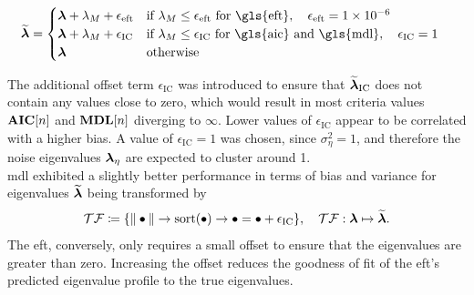 \begin{align}
    \widetilde{\bfm{\lambda}} &=
    \begin{cases}
      \bfm{\lambda} + \lambda_M + \epsilon_{\text{eft}} & \text{if } \lambda_M \leq \epsilon_{\text{eft}} \text{ for \gls{eft}}, \quad \epsilon_{\text{eft}} = \num{1e-6} \\
      \bfm{\lambda} + \lambda_M + \epsilon_{\text{IC}} & \text{if } \lambda_M \leq \epsilon_{\text{IC}} \text{ for \gls{aic} and \gls{mdl}}, \quad \epsilon_{\text{IC}} = \num{1} \\
      \bfm{\lambda} & \text{otherwise}
    \end{cases}
    \label{eq:pos_eigvals}
\end{align}

The additional offset term \( \epsilon_{\text{IC}} \) was introduced to ensure that \( \widetilde{\boldsymbol{\lambda}}_{\text{IC}} \)
does not contain any values close to zero, which would result in most criteria values \( \boldsymbol{\mathrm{AIC}}[n] \)  and \( \boldsymbol{\mathrm{MDL}}[n] \) diverging to
\( \infty \). Lower values of \( \epsilon_{\text{IC}} \) appear to be correlated with a higher bias. A value of \( \epsilon_{\text{IC}} = 1 \) was chosen,
since \( \sigma^2_{\eta} = 1 \), and therefore the noise eigenvalues \( \boldsymbol{\lambda}_{\eta} \) are expected to cluster around 1.\\
\gls{mdl} exhibited a slightly better performance in terms of bias and variance for eigenvalues \( \widetilde{\boldsymbol{\lambda}} \) being
transformed by
\begin{equation}
    \mathcal{TF} \coloneq \{\| \bullet \| \rightarrow \text{sort}(\bullet) \rightarrow \bullet = \bullet + \epsilon_{\text{IC}}\}, \quad \mathcal{TF} : \boldsymbol{\lambda} \mapsto \widetilde{\boldsymbol{\lambda}}.
\end{equation}
The \gls{eft}, conversely, only requires a small offset to ensure that the eigenvalues are greater than zero. Increasing
the offset reduces the goodness of fit of the \gls{eft}'s predicted eigenvalue profile to the true eigenvalues.



